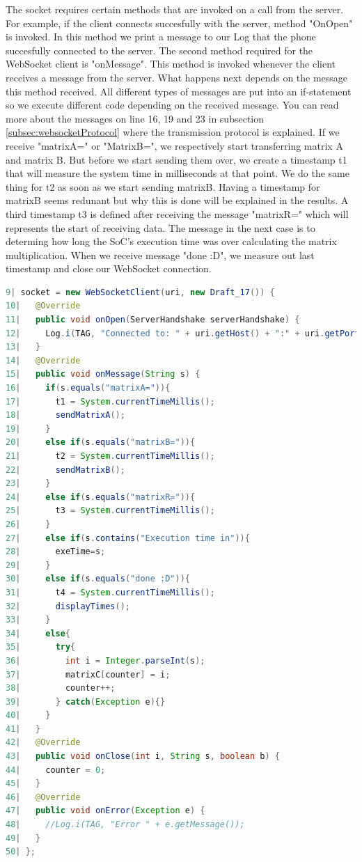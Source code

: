 \documentclass[a4paper, 11pt]{report}
\begin{document}
The socket requires certain methods that are invoked on a call from the server. For example, if the client connects succesfully with the server, method "OnOpen" is invoked. In this method we print a message to our Log that the phone succesfully connected to the server. The second method required for the WebSocket client is "onMessage". This method is invoked whenever the client receives a message from the server. What happens next depends on the message this method received. All different types of messages are put into an if-statement so we execute different code depending on the received message. You can read more about the messages on line 16, 19 and 23 in subsection \ref{subsec:websocketProtocol} where the transmission protocol is explained. If we receive "matrixA=" or "MatrixB=", we respectively start transferring matrix A and matrix B. But before we start sending them over, we create a timestamp t1 that will measure the system time in milliseconds at that point. We do the same thing for t2 as soon as we start sending matrixB. Having a timestamp for matrixB seems redunant but why this is done will be explained in the results. A third timestamp t3 is defined after receiving the message "matrixR=" which will represents the start of receiving data. The message in the next case is to determing how long the SoC's execution time was over calculating the matrix multiplication. When we receive message "done :D", we measure out last timestamp and close our WebSocket connection.

\begin{lstlisting}[caption={Detailed look at creating the WebSocket client},captionpos=b, label={lst:detailWebSocketClient}, language=java, float=h]
 9| socket = new WebSocketClient(uri, new Draft_17()) {
10|   @Override
11|   public void onOpen(ServerHandshake serverHandshake) {
12|     Log.i(TAG, "Connected to: " + uri.getHost() + ":" + uri.getPort());
13|   }
14|   @Override
15|   public void onMessage(String s) {
16|     if(s.equals("matrixA=")){
17|       t1 = System.currentTimeMillis();
18|       sendMatrixA();
19|     }
20|     else if(s.equals("matrixB=")){
21|       t2 = System.currentTimeMillis();
22|       sendMatrixB();
23|     }
24|     else if(s.equals("matrixR=")){
25|       t3 = System.currentTimeMillis();
26|     }
27|     else if(s.contains("Execution time in")){
28|       exeTime=s;
29|     }
30|     else if(s.equals("done :D")){
31|       t4 = System.currentTimeMillis();
32|       displayTimes();
33|     }
34|     else{
35|       try{
36|         int i = Integer.parseInt(s);
37|         matrixC[counter] = i;
38|         counter++;
39|       } catch(Exception e){}
40|     }
41|   }
42|   @Override
43|   public void onClose(int i, String s, boolean b) {
44|     counter = 0;
45|   }
46|   @Override
47|   public void onError(Exception e) {
48|     //Log.i(TAG, "Error " + e.getMessage());
49|   }
50| };
\end{lstlisting}
\end{document}
